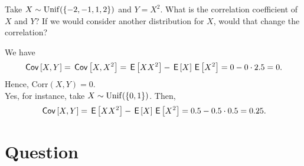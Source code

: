 \begin{exercise}
Take $X\sim\mathrm{Unif}(\{-2, -1, 1, 2\})$ and $Y= X^2$. What is the correlation coefficient of $X$ and $Y$?
If we would consider another distribution for $X$, would that change the correlation?
\begin{solution}
We have
\begin{align}
    \,\mathsf{Cov}\left[X,Y\right] = \,\mathsf{Cov}\left[X,X^2\right] = \,\mathsf{E}\left[XX^2\right] - \,\mathsf{E}\left[X\right]\,\mathsf{E}\left[X^2\right] = 0 - 0\cdot 2.5 = 0.
\end{align}
Hence, $\text{Corr}(X,Y) = 0$. \\
Yes, for instance, take $X \sim \mathrm{Unif}(\{0,1\})$. Then,
\begin{align}
    \,\mathsf{Cov}\left[X,Y\right] = \,\mathsf{E}\left[XX^2\right] - \,\mathsf{E}\left[X\right]\,\mathsf{E}\left[X^2\right] = 0.5 - 0.5\cdot 0.5 = 0.25.
\end{align}
\end{solution}
\end{exercise}


\section{Question}

